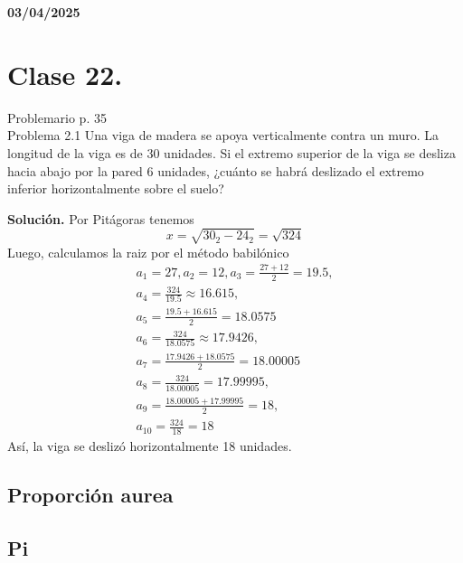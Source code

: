 \textbf{03/04/2025}
\section{Clase 22.}
Problemario p. 35\\

Problema 2.1 Una viga de madera se apoya verticalmente contra un muro. La longitud de la viga es de 30 unidades. Si el extremo superior de la viga se desliza hacia abajo por la pared 6 unidades, ¿cuánto se habrá deslizado el extremo inferior horizontalmente sobre el suelo?

\par
\begin{minipage}[t]{0.66\textwidth}
\textbf{Solución.} 
Por Pitágoras tenemos
$$x=\sqrt{30_{2} - 24_{2}} = \sqrt{324}$$
Luego, calculamos la raiz por el método babilónico
 \begin{gather*}
    a_{1} = 27, a_{2} = 12, a_{3} = \frac{27+12}{2} = 19.5,\\ 
    a_{4} = \frac{324}{19.5} \approx 16.615, \\
    a_{5} = \frac{19.5+16.615}{2} = 18.0575\\
    a_{6} = \frac{324}{18.0575} \approx 17.9426,\\
    a_{7} = \frac{17.9426+18.0575}{2} = 18.00005\\
    a_{8} = \frac{324}{18.00005} = 17.99995,\\
    a_{9} = \frac{18.00005+17.99995}{2} = 18, \\
    a_{10} = \frac{324}{18} = 18
 \end{gather*}
Así, la viga se deslizó horizontalmente 18 unidades.
\end{minipage}
\begin{minipage}[t]{0.3\textwidth}
    \centering
    
\end{minipage}
\par

\subsection{Proporción aurea}

\subsection{Pi}